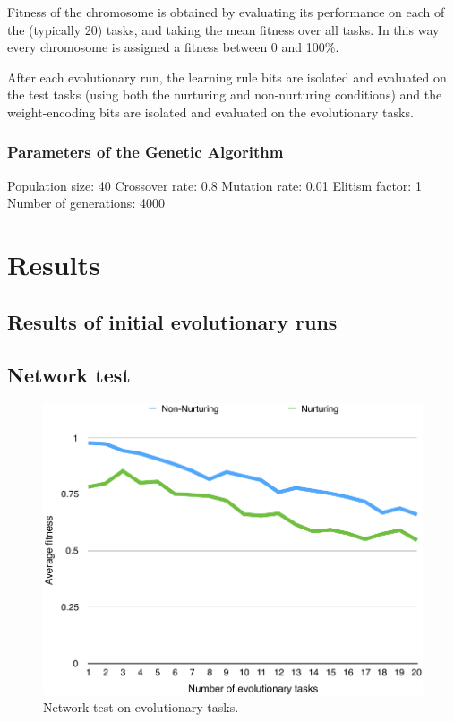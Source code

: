 \documentclass[master]{outhesis}
\begin{document}
Fitness of the chromosome is obtained by evaluating its performance on each of the (typically 20) tasks, and taking the mean fitness over all tasks. In this way every chromosome is assigned a fitness between 0 and 100\%.

After each evolutionary run, the learning rule bits are isolated and evaluated on the test tasks (using both the nurturing and non-nurturing conditions) and the weight-encoding bits are isolated and evaluated on the evolutionary tasks.

\subsubsection{Parameters of the Genetic Algorithm}


Population size: 40
Crossover rate: 0.8
Mutation rate: 0.01
Elitism factor: 1
Number of generations: 4000

\section{Results}

\subsection{Results of initial evolutionary runs}

\subsection{Network test}

\begin{figure}[H]
	\centering
	\includegraphics{NetworkTestPlot.pdf}
	\caption{Network test on evolutionary tasks.}
\end{figure}
\end{document}
